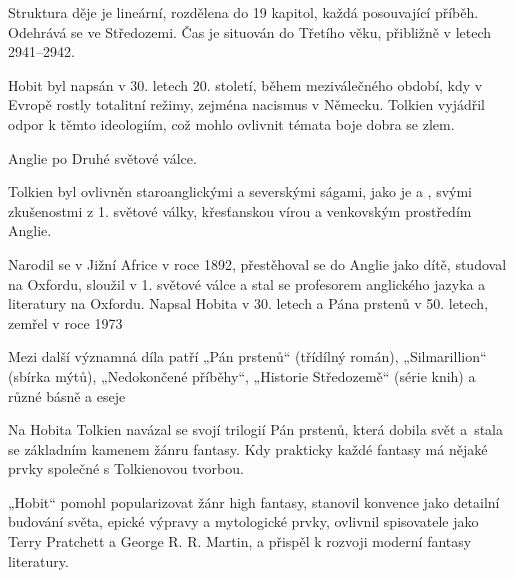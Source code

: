 \documentclass[FGBook.tex]{subfiles}
\begin{document}
\noindent Struktura děje je lineární, rozdělena do 19 kapitol, každá posouvající příběh.
Odehrává se ve Středozemi.
Čas je situován do Třetího věku, přibližně v letech 2941–2942.



\noindent Hobit byl napsán v 30. letech 20. století,
během meziválečného období, kdy v Evropě rostly totalitní režimy, zejména nacismus v Německu.
Tolkien vyjádřil odpor k těmto ideologiím, což mohlo ovlivnit témata boje dobra se zlem.

\noindent Anglie po Druhé světové válce.


\noindent Tolkien byl ovlivněn staroanglickými a severskými ságami,
jako je  a ,
svými zkušenostmi z 1. světové války,
křesťanskou vírou a venkovským prostředím Anglie.

\noindent Narodil se v Jižní Africe v roce 1892,
přestěhoval se do Anglie jako dítě, studoval na Oxfordu,
sloužil v 1. světové válce a stal se profesorem anglického jazyka a literatury na Oxfordu.
Napsal Hobita v 30. letech a Pána prstenů v 50. letech, zemřel v roce 1973


\noindent 
Mezi další významná díla patří „Pán prstenů“ (třídílný román), „Silmarillion“ (sbírka mýtů),
„Nedokončené příběhy“, „Historie Středozemě“ (série knih) a různé básně a eseje

\noindent Na Hobita Tolkien navázal se svojí trilogií Pán prstenů, která dobila svět
a~stala se základním kamenem žánru fantasy.
Kdy prakticky každé fantasy má nějaké prvky společné s Tolkienovou tvorbou.

„Hobit“ pomohl popularizovat žánr high fantasy,
stanovil konvence jako detailní budování světa, epické výpravy a mytologické prvky,
ovlivnil spisovatele jako Terry Pratchett a George R. R. Martin,
a přispěl k rozvoji moderní fantasy literatury.

\vspace*{2em}\\
\end{document}
